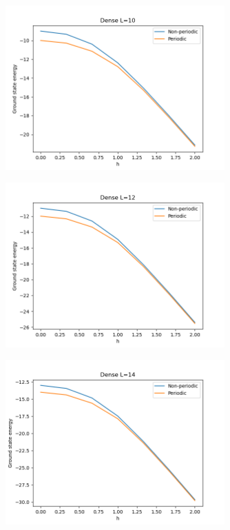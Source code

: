 \documentclass[12pt]{article}
\begin{document}
\begin{figure}
\centering
\includegraphics[width=0.75\textwidth]{dense_ising_model_L10.png}
\end{figure}

\begin{figure}
\centering
\includegraphics[width=0.75\textwidth]{dense_ising_model_L12.png}
\end{figure}

\begin{figure}
\centering
\includegraphics[width=0.75\textwidth]{dense_ising_model_L14.png}
\end{figure}
\end{document}
